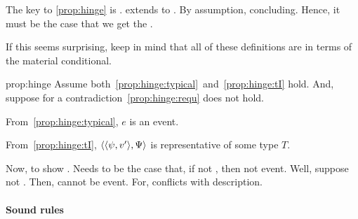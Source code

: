 \begin{note}
  The key to \autoref{prop:hinge} is .
  \tC{} extends \tC{} to .
  By assumption, concluding.
  Hence, it must be the case that we get the \fc{}.

  If this seems surprising, keep in mind that all of these definitions are in terms of the material conditional.

  \begin{argument}{prop:hinge}
    Assume both~\ref{prop:hinge:typical}~and~\ref{prop:hinge:tI} hold.
    And, suppose for a contradiction~\ref{prop:hinge:requ} does not hold.

    From~\ref{prop:hinge:typical}, \(e\) is an event.

    From~\ref{prop:hinge:tI}, \(\langle \langle \psi, v' \rangle, \Psi \rangle\) is representative of some type \(T\).

    Now, to show \requ{}.
    Needs to be the case that, if not \fc{}, then not event.
    Well, suppose not \fc{}.
    Then, cannot be event.
    For, conflicts with description.
  \end{argument}
\end{note}

\paragraph*{Sound rules}

